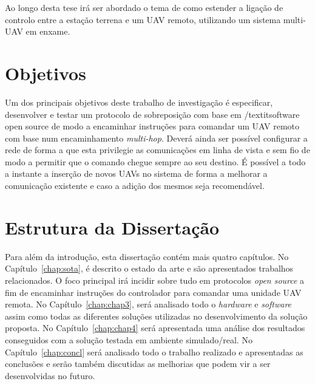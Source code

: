   Ao longo desta tese irá ser abordado o tema de como estender a ligação de controlo entre a estação terrena e um UAV remoto, utilizando um sistema multi-UAV em enxame.
  
  \section{Objetivos}\label{sec:goals}

Um dos principais objetivos deste trabalho de investigação é especificar, desenvolver e testar um protocolo de sobreposição com base em /textit{software open source} de modo a encaminhar instruções para comandar um UAV remoto com base num encaminhamento \textit{multi-hop}. Deverá ainda ser possível configurar a rede de forma a que esta privilegie as comunicações em linha de vista e sem fio de modo a permitir que o comando chegue sempre ao seu destino. É possível a todo a instante a inserção de novos UAVs no sistema de forma a melhorar a comunicação existente e caso a adição dos mesmos seja recomendável.

\section{Estrutura da Dissertação}\label{sec:struct}

Para além da introdução, esta dissertação contém mais quatro capítulos.
No Capítulo~\ref{chap:sota}, é descrito o estado da arte e são
apresentados trabalhos relacionados. O foco principal irá incidir sobre tudo em protocolos \textit{open source} a fim de encaminhar instruções do controlador para comandar uma unidade UAV remota.
No Capítulo~\ref{chap:chap3}, será analisado todo o \textit{hardware} e \textit{software} assim como todas as diferentes soluções utilizadas no desenvolvimento da solução proposta.
No Capítulo~\ref{chap:chap4} será apresentada uma análise dos resultados conseguidos com a solução testada em ambiente simulado/real. 
No Capítulo~\ref{chap:concl} será analisado todo o trabalho realizado e apresentadas as conclusões e serão também discutidas as melhorias que podem vir a ser desenvolvidas no futuro.

